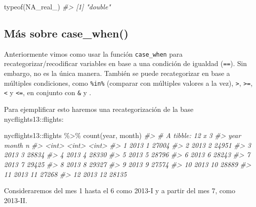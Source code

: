 \documentclass[
]{book}
\newenvironment{Shaded}{\begin{snugshade}}{\end{snugshade}}
\newcommand{\CommentTok}[1]{\textcolor[rgb]{0.56,0.35,0.01}{\textit{#1}}}
\newcommand{\ConstantTok}[1]{\textcolor[rgb]{0.00,0.00,0.00}{#1}}
\newcommand{\FunctionTok}[1]{\textcolor[rgb]{0.00,0.00,0.00}{#1}}
\newcommand{\NormalTok}[1]{#1}
\newcommand{\SpecialCharTok}[1]{\textcolor[rgb]{0.00,0.00,0.00}{#1}}
\begin{document}
\begin{Shaded}
\begin{Highlighting}[]
\FunctionTok{typeof}\NormalTok{(}\ConstantTok{NA\_real\_}\NormalTok{)}
\CommentTok{\#\textgreater{} [1] "double"}
\end{Highlighting}
\end{Shaded}

\hypertarget{muxe1s-sobre-case_when}{%
\subsection{Más sobre case\_when()}\label{muxe1s-sobre-case_when}}

Anteriormente vimos como usar la función \texttt{case\_when} para recategorizar/recodificar variables en base a una condición de igualdad (\texttt{==}). Sin embargo, no es la única manera. También se puede recategorizar en base a múltiples condiciones, como \texttt{\%in\%} (comparar con múltiples valores a la vez), \texttt{\textgreater{}}, \texttt{\textgreater{}=}, \texttt{\textless{}} y \texttt{\textless{}=}, en conjunto con \texttt{\&} y \texttt{\textbar{}}.

Para ejemplificar esto haremos una recategorización de la base nycflights13::flights:

\begin{Shaded}
\begin{Highlighting}[]
\NormalTok{nycflights13}\SpecialCharTok{::}\NormalTok{flights }\SpecialCharTok{\%\textgreater{}\%} 
  \FunctionTok{count}\NormalTok{(year, month)}
\CommentTok{\#\textgreater{} \# A tibble: 12 x 3}
\CommentTok{\#\textgreater{}     year month     n}
\CommentTok{\#\textgreater{}    \textless{}int\textgreater{} \textless{}int\textgreater{} \textless{}int\textgreater{}}
\CommentTok{\#\textgreater{}  1  2013     1 27004}
\CommentTok{\#\textgreater{}  2  2013     2 24951}
\CommentTok{\#\textgreater{}  3  2013     3 28834}
\CommentTok{\#\textgreater{}  4  2013     4 28330}
\CommentTok{\#\textgreater{}  5  2013     5 28796}
\CommentTok{\#\textgreater{}  6  2013     6 28243}
\CommentTok{\#\textgreater{}  7  2013     7 29425}
\CommentTok{\#\textgreater{}  8  2013     8 29327}
\CommentTok{\#\textgreater{}  9  2013     9 27574}
\CommentTok{\#\textgreater{} 10  2013    10 28889}
\CommentTok{\#\textgreater{} 11  2013    11 27268}
\CommentTok{\#\textgreater{} 12  2013    12 28135}
\end{Highlighting}
\end{Shaded}

Consideraremos del mes 1 hasta el 6 como 2013-I y a partir del mes 7, como 2013-II.
\end{document}
